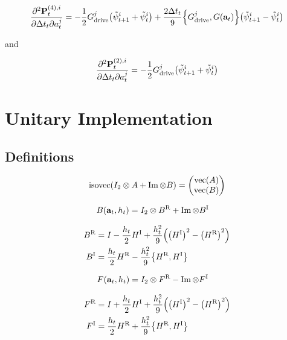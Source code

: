 \documentclass{article}
\newcommand{\isopsi}{\tilde \psi}
\newcommand{\isovec}{\text{isovec}}
\newcommand{\HI}{H^{\text{I}}}
\newcommand{\HR}{H^{\text{R}}}
\newcommand{\BR}{B^{\text{R}}}
\newcommand{\BI}{B^{\text{I}}}
\newcommand{\FR}{F^{\text{R}}}
\newcommand{\FI}{F^{\text{I}}}
\begin{document}
\begin{equation}
  \pdv{\vb{P}_t^{(4),i}}{\Delta t_t}{a^j_t} 
    = -\frac{1}{2} G^j_{\text{drive}} \qty(\isopsi^i_{t+1} + \isopsi^i_{t}) 
    + \frac{2 \Delta t_t}{9} \qty{G^j_{\text{drive}}, G(\vb{a}_t)}\qty(\isopsi^i_{t+1} - \isopsi^i_{t})
\end{equation}

and


\begin{equation}
  \pdv{\vb{P}_t^{(2),i}}{\Delta t_t}{a^j_t} 
    = -\frac{1}{2} G^j_{\text{drive}} \qty(\isopsi^i_{t+1} + \isopsi^i_{t}) 
\end{equation}

\newpage

\section{Unitary Implementation}

\subsection{Definitions}

\begin{equation*}
  \isovec\qty(I_2 \otimes A + \Im \otimes B) = \mqty(\text{vec}(A) \\ \text{vec}(B))
\end{equation*}

\begin{align*}
  B(\vb{a}_t, h_t) &= I_2 \otimes \BR + \Im \otimes \BI 
\end{align*}

\begin{align*}
  \BR &= I - \frac{h_t}{2} \HI + \frac{h_t^2}{9}\qty(\qty(\HI)^2 - \qty(\HR)^2) \\
  \BI &= \frac{h_t}{2} \HR - \frac{h_t^2}{9}\qty{\HR,\HI}
\end{align*}

\begin{align*}
  F(\vb{a}_t, h_t) &= I_2 \otimes \FR - \Im \otimes \FI
\end{align*}

\begin{align*}
  \FR &= I + \frac{h_t}{2} \HI + \frac{h_t^2}{9}\qty(\qty(\HI)^2 - \qty(\HR)^2) \\
  \FI &= \frac{h_t}{2} \HR + \frac{h_t^2}{9}\qty{\HR,\HI}
\end{align*}
\end{document}
